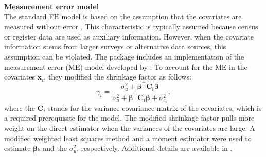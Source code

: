 \textbf{Measurement error model} \\
The standard FH model is based on the assumption that the covariates are measured
without error \citep{Fay1979}. This characteristic is typically assumed because
census or register data are used as auxiliary information. However, when the
covariate information stems from larger surveys or alternative data sources, this
assumption can be violated. The  package includes an implementation of the
measurement error (ME) model developed by \citet{Ybarra2008}. To account for the
ME in the covariates $\boldsymbol{x}_i$, they modified the shrinkage factor as
follows:
%
\begin{equation*}
\gamma_i = \frac{\sigma_u^2 + \boldsymbol{\beta}^{\top} \boldsymbol{C}_i
	\boldsymbol{\beta}}{\sigma_u^2 + \boldsymbol{\beta}^{\top} \boldsymbol{C}_i
	\boldsymbol{\beta} + \sigma_{e_i}^2},
\end{equation*}
%
where the $\boldsymbol{C}_i$ stands for the variance-covariance matrix of the
covariates, which is a required prerequisite for the model. The modified shrinkage factor
pulls more weight on the direct estimator when the variances of the covariates
are large. A modified weighted least squares method and a moment estimator were used to estimate $\boldsymbol{\beta}$s and the $\sigma_u^2$, respectively. Additional details are available in \citet{Ybarra2008}.



